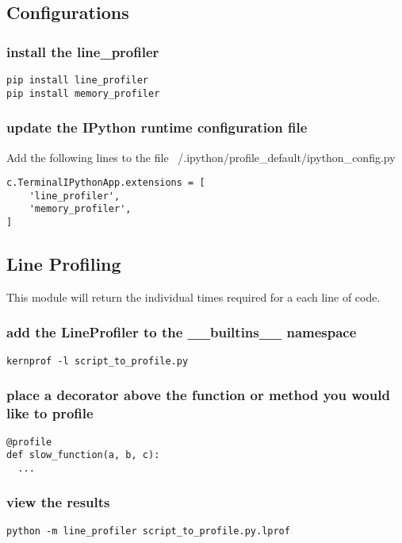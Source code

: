 \subsection{Configurations}

\subsubsection{install the line\_profiler}
\begin{lstlisting}
pip install line_profiler
pip install memory_profiler
\end{lstlisting}

\subsubsection{update the IPython runtime configuration file}
Add the following lines to the file ~/.ipython/profile\_default/ipython\_config.py
\begin{lstlisting}
c.TerminalIPythonApp.extensions = [
    'line_profiler',
    'memory_profiler',
]
\end{lstlisting}

\subsection{Line Profiling}
This module will return the individual times required for a each line of code.

\subsubsection{add the LineProfiler to the \_\_builtins\_\_ namespace}
\begin{lstlisting}
kernprof -l script_to_profile.py
\end{lstlisting}

\subsubsection{place a decorator above the function or method you would like to profile}
\begin{lstlisting}
@profile
def slow_function(a, b, c):
  ...
\end{lstlisting}

\subsubsection{view the results}
\begin{lstlisting}
python -m line_profiler script_to_profile.py.lprof
\end{lstlisting}

